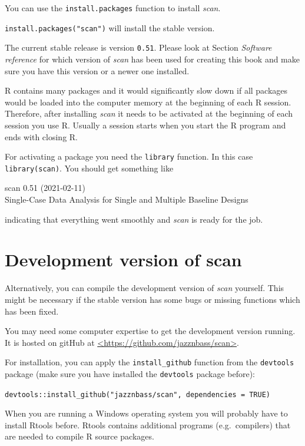 \documentclass[
]{book}
\begin{document}
You can use the \texttt{install.packages} function to install \emph{scan}.

\texttt{install.packages("scan")} will install the stable version.

The current stable release is version \texttt{0.51}. Please look at Section \emph{Software reference} for which version of \emph{scan} has been used for creating this book and make sure you have this version or a newer one installed.

R contains many packages and it would significantly slow down if all packages would be loaded into the computer memory at the beginning of each R session. Therefore, after installing \emph{scan} it needs to be activated at the beginning of each session you use R. Usually a session starts when you start the R program and ends with closing R.

For activating a package you need the \texttt{library} function. In this case \texttt{library(scan)}. You should get something like

scan 0.51 (2021-02-11)\\
Single-Case Data Analysis for Single and Multiple Baseline Designs

indicating that everything went smoothly and \emph{scan} is ready for the job.

\hypertarget{development-version-of-scan}{%
\section{Development version of scan}\label{development-version-of-scan}}

Alternatively, you can compile the development version of \emph{scan} yourself. This might be necessary if the stable version has some bugs or missing functions which has been fixed.

You may need some computer expertise to get the development version running. It is hosted on gitHub at \href{https://github.com/jazznbass/scan}{\textless https://github.com/jazznbass/scan\textgreater{}}.

For installation, you can apply the \texttt{install\_github} function from the \texttt{devtools} package (make sure you have installed the \texttt{devtools} package before):

\texttt{devtools::install\_github("jazznbass/scan",\ dependencies\ =\ TRUE)}

When you are running a Windows operating system you will probably have to install Rtools before. Rtools contains additional programs (e.g.~compilers) that are needed to compile R source packages.
\end{document}
